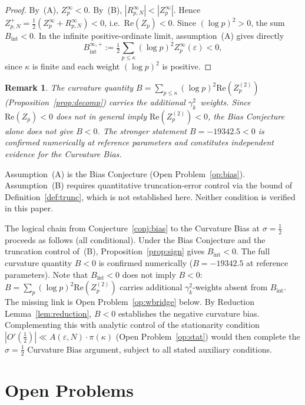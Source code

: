 \documentclass[11pt]{article}
\newtheorem*{remark}{Remark}
\begin{document}
\begin{proof}
By~(A), $Z_p^\infty<0$. By~(B), $|R_{p,N}^\infty|<|Z_p^\infty|$.
Hence $Z_{p,N}^+ = \tfrac{1}{2}(Z_p^\infty + R_{p,N}^\infty) < 0$,
i.e.\ $\mathrm{Re}(Z_p)<0$.
Since $(\log p)^2>0$, the sum $B_{\mathrm{int}} < 0$.
In the infinite positive-ordinate limit, assumption~(A) gives directly
\[
B_{\mathrm{int}}^{\infty,+}
:=\tfrac{1}{2}\sum_{p\leq\kappa}(\log p)^2 Z_p^\infty(\varepsilon)<0,
\]
since $\kappa$ is finite and each weight $(\log p)^2$ is positive.
\end{proof}

\begin{remark}
The curvature quantity $B=\sum_{p\leq\kappa}(\log p)^2\mathrm{Re}(Z_p^{(2)})$
(Proposition~\ref{prop:decomp}) carries the additional $\gamma_k^2$~weights.
Since $\mathrm{Re}(Z_p)<0$ does not in general imply
$\mathrm{Re}(Z_p^{(2)})<0$, the Bias Conjecture alone does not give $B<0$.
The stronger statement $B=-19342.5<0$ is confirmed numerically at reference
parameters and constitutes independent evidence for the Curvature Bias.
\end{remark}

Assumption~(A) is the Bias Conjecture (Open Problem~\ref{op:bias}).
Assumption~(B) requires quantitative truncation-error control via
the bound of Definition~\ref{def:trunc}, which is not established here.
Neither condition is verified in this paper.

The logical chain from Conjecture~\ref{conj:bias} to the Curvature Bias
at $\sigma=\tfrac{1}{2}$ proceeds as follows (all conditional).
Under the Bias Conjecture and the truncation control of~(B),
Proposition~\ref{prop:sign} gives $B_{\mathrm{int}}<0$.
The full curvature quantity $B<0$ is confirmed numerically
($B=-19342.5$ at reference parameters).
Note that $B_{\mathrm{int}}<0$ does not imply $B<0$:
$B = \sum_p (\log p)^2\mathrm{Re}(Z_p^{(2)})$ carries additional
$\gamma_k^2$-weights absent from $B_{\mathrm{int}}$.
The missing link is Open Problem~\ref{op:wbridge} below.
By Reduction Lemma~\ref{lem:reduction}, $B<0$ establishes the
negative curvature bias.
Complementing this with analytic control of the stationarity condition
$|O'(\tfrac{1}{2})|\ll A(\varepsilon,N)\cdot\pi(\kappa)$ (Open Problem~\ref{op:stat})
would then complete the $\sigma=\tfrac{1}{2}$ Curvature Bias argument,
subject to all stated auxiliary conditions.

\section{Open Problems}
\label{sec:open}
\end{document}
